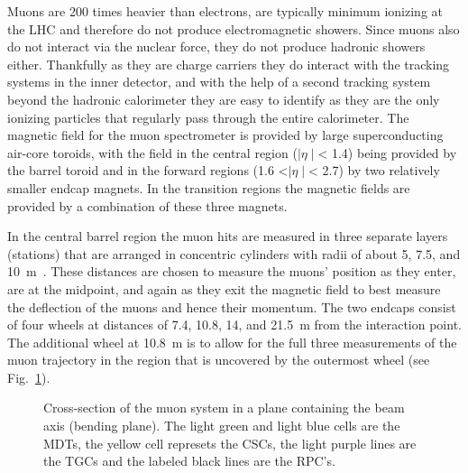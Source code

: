 Muons are 200 times heavier than electrons, are typically minimum ionizing at the LHC and therefore do not produce electromagnetic showers.  
Since muons also do not interact via the nuclear force, they do not produce hadronic showers either.  
Thankfully as they are charge carriers they do interact with the tracking systems in the inner detector, and with the help of a second tracking system beyond the hadronic calorimeter they are easy to identify as they are the only ionizing particles that regularly pass through the entire calorimeter.  
The magnetic field for the muon spectrometer is provided by large superconducting air-core toroids, with the field in the central region ($\mid\eta\mid$< 1.4) being provided by the barrel toroid and in the forward regions (1.6 <$\mid\eta\mid$< 2.7) by two relatively smaller endcap magnets.  
In the transition regions the magnetic fields are provided by a combination of these three magnets.  

In the central barrel region the muon hits are measured in three separate layers (stations) that are arranged in concentric cylinders with radii of about 5, 7.5, and 10~m~\cite{MuonTDR}.  
These distances are chosen to measure the muons' position as they enter, are at the midpoint, and again as they exit the magnetic field to best measure the deflection of the muons and hence their momentum.  
The two endcaps consist of four wheels at distances of 7.4, 10.8, 14, and 21.5~m from the interaction point. 
The additional wheel at 10.8~m is to allow for the full three measurements of the muon trajectory in the region that is uncovered by the outermost wheel (see Fig.~\ref{MuonSpectroFig}).


\begin{figure}[!ht]
  \begin{center}
  \end{center}
  \caption[Muon system cross section.]
      {\small Cross-section of the muon system in a plane containing the beam axis (bending plane).  The light green and light blue cells are the MDTs, the yellow cell represets the CSCs, the light purple lines are the TGCs and the labeled black lines are the RPC's.  }
  \label{MuonSpectroFig}
\end{figure}

